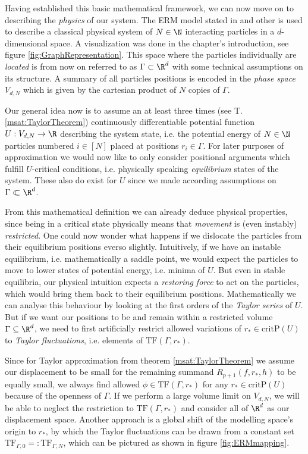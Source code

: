 Having established this basic mathematical framework, we can now move on to describing the \emph{physics} of our system. The ERM model stated in \cite{paper:Grigera_2011,mth:vogel,paper:2405.06537v1,PhysRevLett.130.236101} and other is used to describe a classical physical system of $N\in\N$ interacting particles in a $d$-dimensional space. A visualization was done in the chapter's introduction, see figure \ref{fig:GraphRepresentation}. This space where the particles individually are \emph{located} is from now on referred to as $\Gamma\subset\R^d$ with some technical assumptions on its structure. A summary of all particles positions is encoded in the \emph{phase space} $V_{d,N}$ which is given by the cartesian product of $N$ copies of $\Gamma$. 

Our general idea now is to assume an at least three times (see T.\ref{msat:TaylorTheorem}) continuously differentiable potential function $U:V_{d,N}\to \R$ describing the system state, i.e. the potential energy of $N\in\N$ particles numbered $i\in[N]$ placed at positions $r_i\in\Gamma$. For later purposes of approximation we would now like to only consider positional arguments which fulfill $U$-critical conditions, i.e. physically speaking \emph{equilibrium} states of the system. These also do exist for $U$ since we made according assumptions on $\Gamma\relcom\R^d$.

From this mathematical definition we can already deduce physical properties, since being in a critical state physically means that \emph{movement} is (even instably) \emph{restricted}. One could now wonder what happens if we dislocate the particles from their equilibrium positions everso slightly. Intuitively, if we have an instable equilibrium, i.e. mathematically a saddle point, we would expect the particles to move to lower states of potential energy, i.e. minima of $U$. But even in stable equilibria, our physical intuition expects a \emph{restoring force} to act on the particles, which would bring them back to their equilibrium positions. Mathematically we can analyse this behaviour by looking at the first orders of the \emph{Taylor series} of $U$. But if we want our positions to be and remain within a restricted volume $\Gamma\subseteq\R^d$, we need to first artificially restrict allowed variations of $r_*\in\text{critP}(U)$ to \emph{Taylor fluctuations}, i.e. elements of $\text{TF}(\Gamma,r_*)$.

Since for Taylor approximation from theorem \ref{msat:TaylorTheorem} we assume our displacement to be small for the remaining summand $R_{p+1}(f,r_*,h)$ to be equally small, we always find allowed $\phi\in\text{TF}(\Gamma,r_*)$ for any $r_*\in\text{critP}(U)$ because of the openness of $\Gamma$. If we perform a large volume limit on $V_{d,N}$, we will be able to neglect the restriction to $\text{TF}(\Gamma,r_*)$ and consider all of $\R^d$ as our displacement space. Another approach is a global shift of the modelling space's origin to $r_*$, by which the Taylor fluctuations can be drawn from a constant set $\text{TF}_{\Gamma,0} =: \text{TF}_{\Gamma,N}$, which can be pictured as shown in figure \ref{fig:ERMmapping}.
